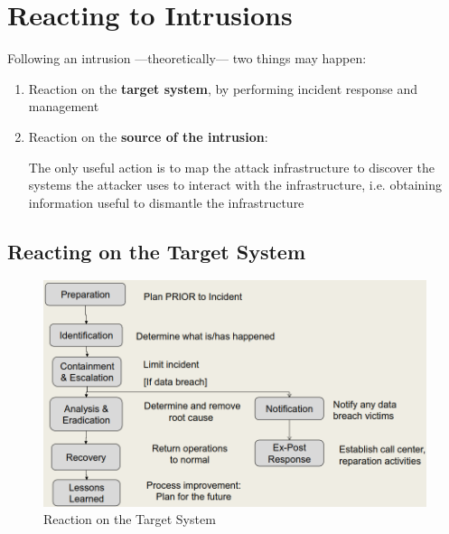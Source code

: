 \chapter{Reacting to Intrusions}
Following an intrusion {---}theoretically{---} two things may happen:
\begin{enumerate}
   \item Reaction on the \textbf{target system},
   by performing incident response and
   management
   \item Reaction on the \textbf{source of the intrusion}:
   
   \setlength\parindent{1em}
   The only useful action is to map the attack infrastructure to discover the systems the attacker uses to interact with the
   infrastructure,
   i.e. obtaining information useful to dismantle the infrastructure
      
\end{enumerate}

\section{Reacting on the Target System}
\begin{figure}[htbp]
   \centering
   \includegraphics[width=0.45\columnwidth]{images/incident_response.png}
   \caption{Reaction on the Target System}
   \label{fig:incident_response}
\end{figure}

